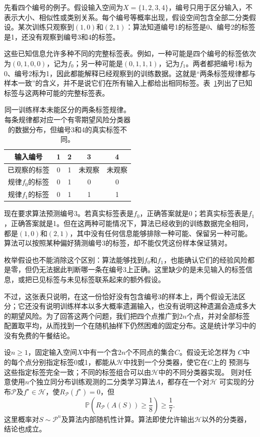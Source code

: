先看四个编号的例子。假设输入空间为$X=\{1,2,3,4\}$，编号只用于区分输入，不表示大小、相似性或类别关系。每个编号等概率出现，假设空间包含全部二分类假设。某次训练只观察到$(1,0)$和$(2,1)$：算法知道编号1的标签是0、编号2的标签是1，还没有观察到编号3和4的标签。

这些已知信息允许多种不同的完整标签表。例如，一种可能是四个编号的标签依次为$(0,1,0,0)$，记为$f_0$；另一种可能是$(0,1,1,1)$，记为$f_1$。两者都把编号1标为0、编号2标为1，因此都能解释已经观察到的训练数据。这就是“两条标签规律都与样本一致”的含义，并不是说它们在所有输入上都给出相同标签。表~\ref{tab:no-free-lunch-labelings}列出了已知标签与这两种可能的完整标签表。
\begin{table}[htbp]
 \centering
 \begin{tabular}{ccccc}
 \toprule
 输入编号 & 1 & 2 & 3 & 4\\
 \midrule
 已观察的标签 & 0 & 1 & 未观察 & 未观察\\
 规律$f_0$的标签 & 0 & 1 & 0 & 0\\
 规律$f_1$的标签 & 0 & 1 & 1 & 1\\
 \bottomrule
 \end{tabular}
 \caption{同一训练样本未能区分的两条标签规律。每条规律都对应一个有零期望风险分类器的数据分布，但编号3和4的真实标签不同。}
 \label{tab:no-free-lunch-labelings}
\end{table}
现在要求算法预测编号3。若真实标签表是$f_0$，正确答案就是0；若真实标签表是$f_1$，正确答案就是1。但在这两种可能情况下，算法已经收到的训练数据完全相同，都是$(1,0)$和$(2,1)$，其中没有任何信息能够排除一种可能、保留另一种可能。算法可以按照某种偏好猜测编号3的标签，却不能仅凭这份样本保证猜对。

枚举假设也不能消除这个区别：算法能够找到$f_0$和$f_1$，也能确认它们的经验风险都是零，但仍无法据此判断哪一条在编号3上正确。这里缺少的是未见输入的标签信息，或把已见标签与未见标签联系起来的额外假设。

不过，这张表只说明，在这一份恰好没有包含编号3的样本上，两个假设无法区分；它还没有说明训练样本以多大概率遗漏输入，也没有说明这种遗漏会造成多大的期望风险。为了回答这两个问题，我们把四个点推广到$2n$个点，并对全部标签配置取平均，从而找到一个在随机抽样下仍然困难的固定分布。这是统计学习中的没有免费的午餐结论。

\begin{theorem}[没有免费的午餐]
\label{thm:no-free-lunch-classification}
设$n\geq1$，固定输入空间$X$中有一个含$2n$个不同点的集合$C$。假设无论怎样为
$C$中的每个点分别指定标签0或1，都能从$\mathcal H$中找到一个分类器，使它在$C$上的
预测与这些指定标签完全一致；不同的标签组合可以由$\mathcal H$中的不同分类器实现。
则对任意使用$n$个独立同分布训练观测的二分类学习算法$A$，都存在一个对$\mathcal H$
可实现的分布$\mathcal P$及$f^\star\in\mathcal H$，使$R_{\mathcal P}(f^\star)=0$，但
\begin{equation}
 \mathbb P\left(R_{\mathcal P}(A(S))\geq\frac18\right)\geq\frac17.
 \label{eq:no-free-lunch-probability}
\end{equation}
这里概率对$S\sim\mathcal P^n$及算法内部随机性计算。算法即使允许输出$\mathcal H$以外的分类器，结论也成立。
\end{theorem}

